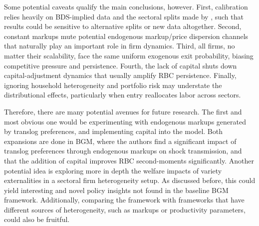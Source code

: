 \documentclass[a4paper,12pt]{article} %
\numberwithin{equation}{section} %
\numberwithin{figure}{section}
\numberwithin{table}{section}
\begin{document}
Some potential caveats qualify the main conclusions, however. First, calibration relies heavily on BDS-implied data and the sectoral splits made by 
\textcite{sedlavcek2017growth}, such that results could be sensitive to alternative splits or new data altogether. Second, constant markups mute 
potential endogenous markup/price dispersion channels that naturally play an important role in firm dynamics. Third, all firms, no matter their scalability,
face the same uniform exogenous exit probability, biasing competitive pressure and persistence. Fourth, the lack of capital shuts down capital-adjustment
dynamics that usually amplify RBC persistence. Finally, ignoring household heterogeneity and portfolio risk may understate the distributional
effects, particularly when entry reallocates labor across sectors.

Therefore, there are many potential avenues for future research. The first and most obvious one would be experimenting with endogenous markups generated by
translog preferences, and implementing capital into the model. Both expansions are done in BGM, where the authors find a significant
impact of translog preferences through endogenous markups on shock transmission, and that the addition of capital improves RBC second-moments significantly.
Another potential idea is exploring more in depth the welfare impacts of variety externalities in a sectoral firm heterogeneity setup. As discussed before, 
this could yield interesting and novel policy insights not found in the baseline BGM framework. Additionally, comparing the framework with frameworks 
that have different sources of heterogeneity, such as markups or productivity parameters, could also be fruitful. 




\newpage
\thispagestyle{plain}
\printbibliography[heading=bibintoc] %
\end{document}
